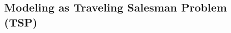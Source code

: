 \documentclass[a4paper]{article}
\begin{document}




\subsection{Modeling as Traveling Salesman Problem (TSP)}

\end{document}
